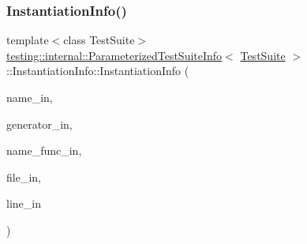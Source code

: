 \subsubsection{\texorpdfstring{InstantiationInfo()}{InstantiationInfo()}\hspace{0.1cm}{\footnotesize\ttfamily [1/2]}}
{\footnotesize\ttfamily template$<$class Test\+Suite$>$ \\
\mbox{\hyperlink{classtesting_1_1internal_1_1_parameterized_test_suite_info}{testing\+::internal\+::\+Parameterized\+Test\+Suite\+Info}}$<$ \mbox{\hyperlink{classtesting_1_1_test_suite}{Test\+Suite}} $>$\+::Instantiation\+Info\+::\+Instantiation\+Info (\begin{DoxyParamCaption}\item[{const std\+::string \&}]{name\+\_\+in,  }\item[{Generator\+Creation\+Func $\ast$}]{generator\+\_\+in,  }\item[{\mbox{\hyperlink{classtesting_1_1internal_1_1_parameterized_test_suite_info_a3b4f232b7d6d3df941bb8e81b6b534a4}{Param\+Name\+Generator\+Func}} $\ast$}]{name\+\_\+func\+\_\+in,  }\item[{const char $\ast$}]{file\+\_\+in,  }\item[{int}]{line\+\_\+in }\end{DoxyParamCaption})\hspace{0.3cm}{\ttfamily [inline]}}

\mbox{\label{structtesting_1_1internal_1_1_parameterized_test_suite_info_1_1_instantiation_info_a1cde67cef70758ca16047040747e19c0}} 
